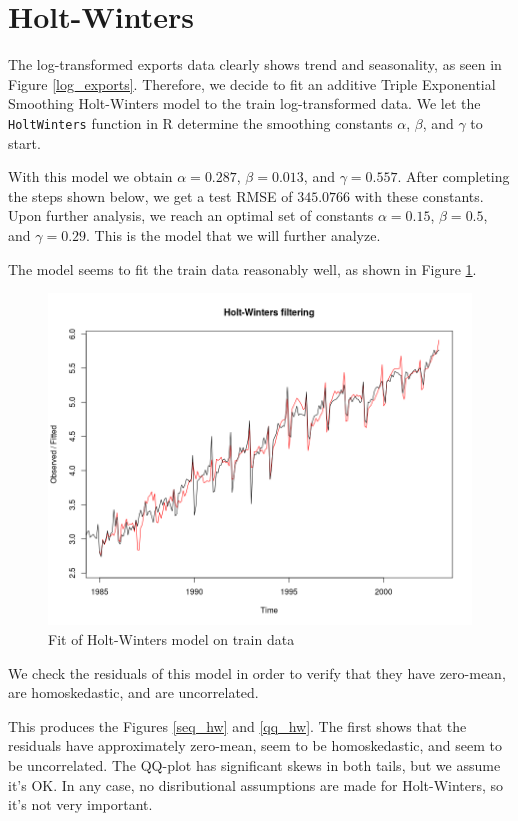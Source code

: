 \documentclass[]{article}
\begin{document}
\newpage
\section{Holt-Winters}
The log-transformed exports data clearly shows trend and seasonality, as seen in Figure \ref{log_exports}. Therefore, we decide to fit an additive Triple Exponential Smoothing Holt-Winters model to the train log-transformed data. We let the \texttt{HoltWinters} function in R determine the smoothing constants $\alpha$, $\beta$, and $\gamma$ to start.

With this model we obtain $\alpha = 0.287$, $\beta = 0.013$, and $\gamma = 0.557$. After completing the steps shown below, we get a test RMSE of $345.0766$ with these constants. Upon further analysis, we reach an optimal set of constants $\alpha = 0.15$, $\beta = 0.5$, and $\gamma = 0.29$. This is the model that we will further analyze.

The model seems to fit the train data reasonably well, as shown in Figure \ref{fit_hw}.

\begin{figure}[!ht]
\centering
\includegraphics[width=.8\textwidth]{fit_hw}
\caption{Fit of Holt-Winters model on train data}
\label{fit_hw}
\end{figure}

We check the residuals of this model in order to verify that they have zero-mean, are homoskedastic, and are uncorrelated.

This produces the Figures \ref{seq_hw} and \ref{qq_hw}. The first shows that the residuals have approximately zero-mean, seem to be homoskedastic, and seem to be uncorrelated. The QQ-plot has significant skews in both tails, but we assume it's OK. In any case, no disributional assumptions are made for Holt-Winters, so it's not very important.
\end{document}
